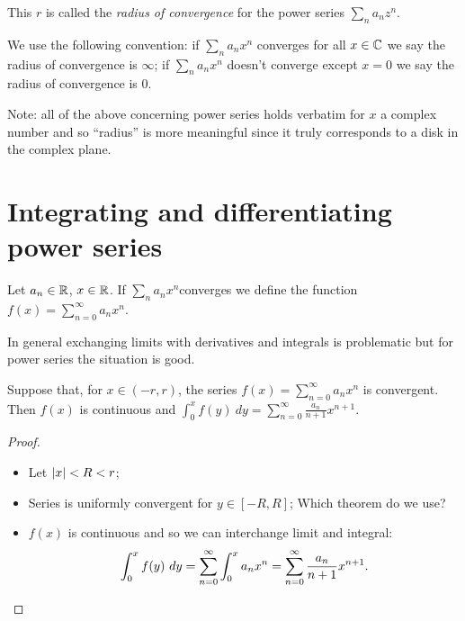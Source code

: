 \begin{definition}
  This \(r\) is called the \emph{radius of convergence} for the power series \(\sum_n a_n z^n\).
\end{definition}

We use the following convention:
if \(\sum_n a_n x^n\) converges for all \(x\in \mathbb{C}\) we say the radius of convergence is \(\infty\);
if \(\sum_n a_n x^n\) doesn't converge except  \(x=0\) we say the radius of convergence is \(0\).

Note: all of the above concerning power series holds verbatim for \(x\) a complex number and so ``radius'' is more meaningful since it truly corresponds to a disk in the complex plane.




\section{Integrating and differentiating power series}



Let \(a_n \in \mathbb{R}\), \(x\in \mathbb{R}\).
If \(\sum_n a_n x^n\)converges we define the function \(f(x) = \sum_{n=0}^{\infty} a_n x^n\).

In general exchanging limits with derivatives and integrals is problematic but for power series the situation is good.



\begin{theorem}%
  \label{thm:integrate-power}
  Suppose that, for \(x\in (-r,r)\), the series  \(f(x) = \sum_{n=0}^{\infty} a_n x^n\) is convergent.
  Then \(f(x)\) is continuous and \(\int_0^x f(y) \ dy = \sum_{n=0}^{\infty} \frac{a_n}{n+1} x^{n+1}\).
\end{theorem}

\begin{proof}
  \begin{itemize}
    \item Let \(\left|x\right|<R<r\);
    \item Series is uniformly convergent for \(y\in[-R,R]\);
          {Which theorem do we use?}
    \item \(f(x)\) is continuous and so we can interchange limit and integral: %
          \[
            \int_0^x f(y) \ dy
            = \sum_{n=0}^{\infty} \int_0^x  {a_n} x^{n}
            = \sum_{n=0}^{\infty} \frac{a_n}{n+1} x^{n+1}. \qedhere
          \]
  \end{itemize}
\end{proof}


